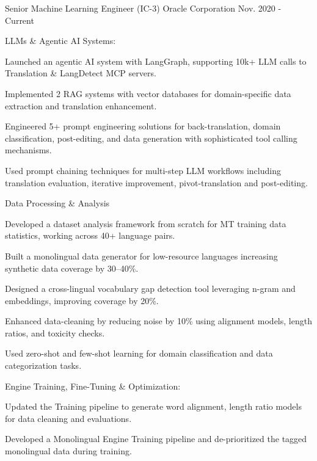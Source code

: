 \begin{cventries}
  \cvexperience
    {Senior Machine Learning Engineer (IC-3)}
    {Oracle Corporation}
    {}
    {}
    {Nov. 2020 - Current}
    {
      \begin{cvitemswithheading}
        {LLMs \& Agentic AI Systems:}
        \item {Launched an agentic AI system with LangGraph, supporting 10k+ LLM calls to Translation \& LangDetect MCP servers.}
        \item {Implemented 2 RAG systems with vector databases for domain-specific data extraction and translation enhancement.}
        \item {Engineered 5+ prompt engineering solutions for back-translation, domain classification, post-editing, and data generation with sophisticated tool calling mechanisms.}
        \item {Used prompt chaining techniques for multi-step LLM workflows including translation evaluation, iterative improvement, pivot-translation and post-editing.}
      \end{cvitemswithheading}
    }
  \cvexpproj
  {
    \begin{cvitemswithheading}
        {Data Processing \& Analysis}
         \item {Developed a dataset analysis framework from scratch for MT training data statistics, working across 40+ language pairs.}
        \item {Built a monolingual data generator for low-resource languages increasing synthetic data coverage by 30–40\%.}
        \item {Designed a cross-lingual vocabulary gap detection tool leveraging n-gram and embeddings, improving coverage by 20\%.}
        \item {Enhanced data-cleaning by reducing noise by 10\% using alignment models, length ratios, and toxicity checks.}
        \item {Used zero-shot and few-shot learning for domain classification and data categorization tasks.}
    \end{cvitemswithheading}
  }
  \cvexpproj
  {
    \begin{cvitemswithheading}
        {Engine Training, Fine-Tuning \& Optimization:}
        \item {Updated the Training pipeline to generate word alignment, length ratio models for data cleaning and evaluations.}
        \item {Developed a Monolingual Engine Training pipeline and de-prioritized the tagged monolingual data during training.}

\end{cvitemswithheading}}
\end{cventries}
